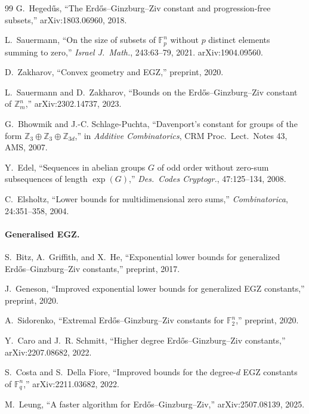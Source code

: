 \documentclass[11pt,a4paper]{article}
\theoremstyle{plain}
\theoremstyle{definition}
\theoremstyle{remark}
\newcommand{\F}{\mathbb{F}}
\newcommand{\Z}{\mathbb{Z}}
\begin{document}
\begin{thebibliography}{99}
G.~Heged\H{u}s, ``The Erd\H{o}s--Ginzburg--Ziv constant and progression-free subsets,'' arXiv:1803.06960, 2018.

L.~Sauermann, ``On the size of subsets of $\F_p^n$ without $p$ distinct elements summing to zero,'' \emph{Israel J.\ Math.}, 243:63--79, 2021. arXiv:1904.09560.

D.~Zakharov, ``Convex geometry and EGZ,'' preprint, 2020.

L.~Sauermann and D.~Zakharov, ``Bounds on the Erd\H{o}s--Ginzburg--Ziv constant of $\Z_m^n$,'' arXiv:2302.14737, 2023.

G.~Bhowmik and J.-C. Schlage-Puchta, ``Davenport's constant for groups of the form $\Z_3 \oplus \Z_3 \oplus \Z_{3d}$,'' in \emph{Additive Combinatorics}, CRM Proc.\ Lect.\ Notes 43, AMS, 2007.

Y.~Edel, ``Sequences in abelian groups $G$ of odd order without zero-sum subsequences of length $\exp(G)$,'' \emph{Des.\ Codes Cryptogr.}, 47:125--134, 2008.

C.~Elsholtz, ``Lower bounds for multidimensional zero sums,'' \emph{Combinatorica}, 24:351--358, 2004.

\paragraph{Generalised EGZ.}

S.~Bitz, A.~Griffith, and X.~He, ``Exponential lower bounds for generalized Erd\H{o}s--Ginzburg--Ziv constants,'' preprint, 2017.

J.~Geneson, ``Improved exponential lower bounds for generalized EGZ constants,'' preprint, 2020.

A.~Sidorenko, ``Extremal Erd\H{o}s--Ginzburg--Ziv constants for $\F_2^n$,'' preprint, 2020.

Y.~Caro and J.~R. Schmitt, ``Higher degree Erd\H{o}s--Ginzburg--Ziv constants,'' arXiv:2207.08682, 2022.

S.~Costa and S.~Della Fiore, ``Improved bounds for the degree-$d$ EGZ constants of $\F_q^n$,'' arXiv:2211.03682, 2022.

M.~Leung, ``A faster algorithm for Erd\H{o}s--Ginzburg--Ziv,'' arXiv:2507.08139, 2025.


\end{thebibliography}
\end{document}
